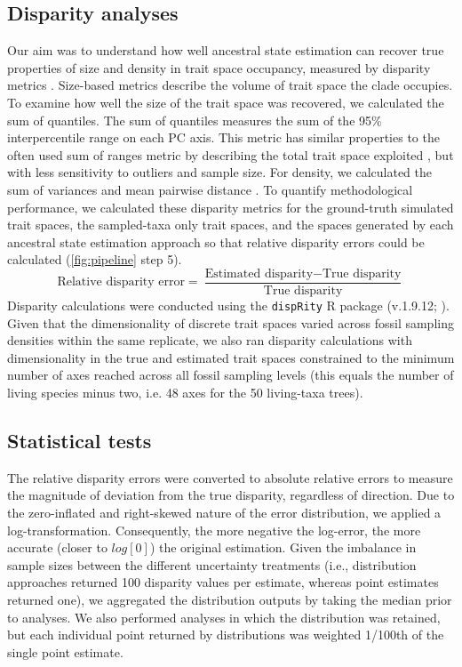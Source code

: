 \documentclass[11pt, a4paper]{article}
\newcommand{\ase}{ancestral state estimation }
\begin{document}
\subsection{Disparity analyses}
Our aim was to understand how well ancestral state estimation can recover true properties of size and density in trait space occupancy, measured by disparity metrics \citep{guillerme2020shifting}.
Size-based metrics describe the volume of trait space the clade occupies.
To examine how well the size of the trait space was recovered, we calculated the sum of quantiles.
The sum of quantiles measures the sum of the 95\% interpercentile range on each PC axis.
This metric has similar properties to the often used sum of ranges metric by describing the total trait space exploited \citep{foote1992rarefaction}, but with less sensitivity to outliers and sample size.
For density, we calculated the sum of variances and mean pairwise distance \citep{foote1991morphological,foote1992paleozoic}. 
To quantify methodological performance, we calculated these disparity metrics for the ground-truth simulated trait spaces, the sampled-taxa only trait spaces, and the spaces generated by each \ase approach so that relative disparity errors could be calculated (\autoref{fig:pipeline} step 5).
\begin{equation}
\text{Relative disparity error} = \frac{\text{Estimated disparity} - \text{True disparity}}{\text{True disparity}}
\end{equation}
Disparity calculations were conducted using the \texttt{dispRity} R package (v.1.9.12; \citealp{guillerme2018disprity}).
Given that the dimensionality of discrete trait spaces varied across fossil sampling densities within the same replicate, we also ran disparity calculations with dimensionality in the true and estimated trait spaces constrained to the minimum number of axes reached across all fossil sampling levels (this equals the number of living species minus two, i.e. 48 axes for the 50 living-taxa trees).
\subsection{Statistical tests}
The relative disparity errors were converted to absolute relative errors to measure the magnitude of deviation from the true disparity, regardless of direction.
Due to the zero-inflated and right-skewed nature of the error distribution, we applied a log-transformation.
Consequently, the more negative the log-error, the more accurate (closer to $log[0]$) the original estimation.
Given the imbalance in sample sizes between the different uncertainty treatments (i.e., distribution approaches returned 100 disparity values per estimate, whereas point estimates returned one), we aggregated the distribution outputs by taking the median prior to analyses.
We also performed analyses in which the distribution was retained, but each individual point returned by distributions was weighted 1/100th of the single point estimate.
\end{document}
